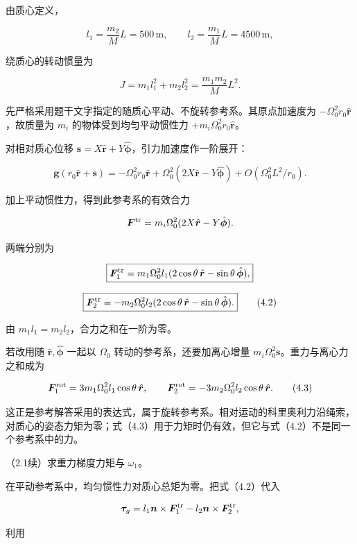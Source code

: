 \documentclass[12pt,a4paper,fontset=fandol]{ctexart}
\begin{document}
由质心定义，

\[
l_1=\frac{m_2}{M}L=500\,\mathrm m,\qquad
l_2=\frac{m_1}{M}L=4500\,\mathrm m,
\]

绕质心的转动惯量为

\[
J=m_1l_1^2+m_2l_2^2=\frac{m_1m_2}{M}L^2.
\tag{4.1}
\]

先严格采用题干文字指定的随质心平动、不旋转参考系。其原点加速度为
\(-\Omega_0^2r_0\hat{\boldsymbol r}\)，故质量为 \(m_i\)
的物体受到均匀平动惯性力 \(+m_i\Omega_0^2r_0\hat{\boldsymbol r}\)。

对相对质心位移
\(\boldsymbol s=X\hat{\boldsymbol r}+Y\hat{\boldsymbol\phi}\)，引力加速度作一阶展开：

\[
\boldsymbol g(r_0\hat{\boldsymbol r}+\boldsymbol s)
=-\Omega_0^2r_0\hat{\boldsymbol r}
+\Omega_0^2(2X\hat{\boldsymbol r}-Y\hat{\boldsymbol\phi})
+O\!\left(\Omega_0^2L^2/r_0\right).
\]

加上平动惯性力，得到此参考系的有效合力

\[
\boldsymbol F^{\rm tr}
=m_i\Omega_0^2(2X\hat{\boldsymbol r}-Y\hat{\boldsymbol\phi}).
\]

两端分别为

\[
\boxed{\boldsymbol F_1^{\rm tr}
=m_1\Omega_0^2l_1(2\cos\theta\,\hat{\boldsymbol r}
-\sin\theta\,\hat{\boldsymbol\phi}),}
\]

\[
\boxed{\boldsymbol F_2^{\rm tr}
=-m_2\Omega_0^2l_2(2\cos\theta\,\hat{\boldsymbol r}
-\sin\theta\,\hat{\boldsymbol\phi}).}
\tag{4.2}
\]

由 \(m_1l_1=m_2l_2\)，合力之和在一阶为零。

若改用随 \(\hat{\boldsymbol r},\hat{\boldsymbol\phi}\) 一起以
\(\Omega_0\) 转动的参考系，还要加离心增量
\(m_i\Omega_0^2\boldsymbol s\)。重力与离心力之和成为

\[
\boldsymbol F_1^{\rm rot}=3m_1\Omega_0^2l_1\cos\theta\,\hat{\boldsymbol r},
\qquad
\boldsymbol F_2^{\rm rot}=-3m_2\Omega_0^2l_2\cos\theta\,\hat{\boldsymbol r}.
\tag{4.3}
\]

这正是参考解答采用的表达式，属于旋转参考系。相对运动的科里奥利力沿绳索，对质心的姿态力矩为零；式（4.3）用于力矩时仍有效，但它与式（4.2）不是同一个参考系中的力。

（2.1续）求重力梯度力矩与 \(\omega_1\)。

在平动参考系中，均匀惯性力对质心总矩为零。把式（4.2）代入

\[
\boldsymbol\tau_g=l_1\boldsymbol n\times\boldsymbol F_1^{\rm tr}
-l_2\boldsymbol n\times\boldsymbol F_2^{\rm tr},
\]

利用
\end{document}
